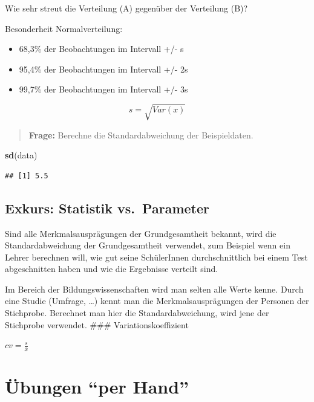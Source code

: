 \documentclass[
]{book}
\newenvironment{Shaded}{\begin{snugshade}}{\end{snugshade}}
\newcommand{\KeywordTok}[1]{\textcolor[rgb]{0.13,0.29,0.53}{\textbf{#1}}}
\newcommand{\NormalTok}[1]{#1}
\providecommand{\tightlist}{%
  \setlength{\itemsep}{0pt}\setlength{\parskip}{0pt}}
\begin{document}
Wie sehr streut die Verteilung (A) gegenüber der Verteilung (B)?

Besonderheit Normalverteilung:

\begin{itemize}
\tightlist
\item
  68,3\% der Beobachtungen im Intervall +/- s
\item
  95,4\% der Beobachtungen im Intervall +/- 2s
\item
  99,7\% der Beobachtungen im Intervall +/- 3s
\end{itemize}

\[ s = \sqrt{Var(x)}\]

\begin{quote}
\textbf{Frage:} Berechne die Standardabweichung der Beispieldaten.
\end{quote}

\begin{Shaded}
\begin{Highlighting}[]
\KeywordTok{sd}\NormalTok{(data)}
\end{Highlighting}
\end{Shaded}

\begin{verbatim}
## [1] 5.5
\end{verbatim}

\hypertarget{exkurs-statistik-vs.-parameter}{%
\subsection{Exkurs: Statistik vs.~Parameter}\label{exkurs-statistik-vs.-parameter}}

Sind alle Merkmalsausprägungen der Grundgesamtheit bekannt, wird die Standardabweichung der Grundgesamtheit verwendet, zum Beispiel wenn ein Lehrer berechnen will, wie gut seine SchülerInnen durchschnittlich bei einem Test abgeschnitten haben und wie die Ergebnisse verteilt sind.

Im Bereich der Bildungswissenschaften wird man selten alle Werte kenne. Durch eine Studie (Umfrage, \ldots) kennt man die Merkmalsausprägungen der Personen der Stichprobe. Berechnet man hier die Standardabweichung, wird jene der Stichprobe verwendet.
\#\#\# Variationskoeffizient

\(cv = \frac{s}{\bar{x}}\)

\hypertarget{uxfcbungen-per-hand}{%
\section{Übungen ``per Hand''}\label{uxfcbungen-per-hand}}
\end{document}
